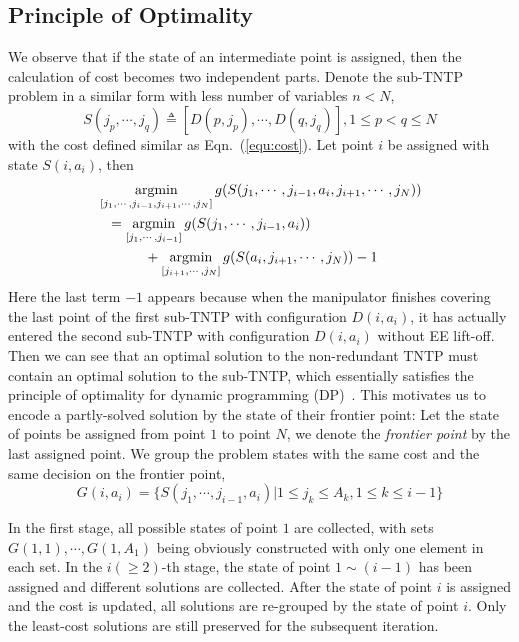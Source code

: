 \documentclass[letterpaper, 10 pt, journal, twoside]{ieeetran}  %
\begin{document}
\subsection{Principle of Optimality}

We observe that if the state of an intermediate point is assigned, then the calculation of cost becomes two independent parts. Denote the sub-TNTP problem in a similar form with less number of variables $n<N$, 
\begin{equation}
S(j_p, \cdots, j_q) \triangleq [D(p, j_p), \cdots, D(q, j_q)], 1\leq p <q \leq N
\end{equation}
with the cost defined similar as Eqn.~(\ref{equ:cost}). 
Let point $i$ be assigned with state $S(i, a_i)$, then 
\begin{equation}
\begin{aligned}
&\mathop{\rm argmin}\limits_{[j_1, \cdots, j_{i-1}, j_{i+1}, \cdots, j_N]} g(S(j_1, \cdots, j_{i-1}, a_i, j_{i+1}, \cdots, j_N))\\
&~~= \mathop{\rm argmin}\limits_{[j_1, \cdots, j_{i-1}]} g(S(j_1, \cdots, j_{i-1}, a_i))\\
&~~~~~~~~~~+\mathop{\rm argmin}\limits_{[j_{i+1}, \cdots, j_N]} g(S(a_i, j_{i+1}, \cdots, j_N))-1
\end{aligned}
\end{equation}
Here the last term $-1$ appears because when the manipulator finishes covering the last point of the first sub-TNTP with configuration $D(i, a_i)$, it has actually entered the second sub-TNTP with configuration $D(i, a_i)$ without EE lift-off. 
Then we can see that an optimal solution to the non-redundant TNTP must contain an optimal solution to the sub-TNTP, which essentially satisfies the principle of optimality for dynamic programming (DP)~\cite{Bellman2013Dynamic}. 
This motivates us to encode a partly-solved solution by the state of their frontier point:  
Let the state of points be assigned from point $1$ to point $N$, we denote the \textit{frontier point} by the last assigned point. 
We group the problem states with the same cost and the same decision on the frontier point, 
\begin{equation}
G(i, a_i) = \{S(j_1, \cdots, j_{i-1}, a_i)|1\leq j_k \leq A_k, 1\leq k\leq i-1\}
\end{equation}

In the first stage, all possible states of point $1$ are collected, with sets $G(1, 1), \cdots, G(1, A_1)$ being obviously constructed with only one element in each set. 
In the $i(\geq 2)$-th stage, the state of point $1\sim(i-1)$ has been assigned and different solutions are collected. After the state of point $i$ is assigned and the cost is updated, all solutions are re-grouped by the state of point $i$. Only the least-cost solutions are still preserved for the subsequent iteration. 
\end{document}
